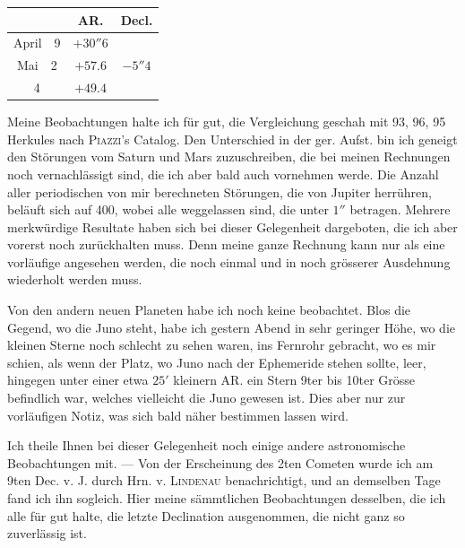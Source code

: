 \begin{center}
\fontsize{10}{12}\selectfont\setlength{\tabcolsep}{3pt}\renewcommand{\arraystretch}{1.15}\begin{tabular}{c|c|c}
 & AR. & Decl. \\
\hline
April\ \ 9 & $+30''6$ & \\
Mai\ \ 2 & $+57.6$ & $-5''4$ \\
4 & $+49.4$ & \\
\end{tabular}
\end{center}

\par\indent Meine Beobachtungen halte ich für gut, die Vergleichung geschah mit 93, 96, 95 Herkules nach \textsc{Piazzi}'s Catalog. Den Unterschied in der ger. Aufst. bin ich geneigt den Störungen vom Saturn und Mars zuzuschreiben, die bei meinen Rechnungen noch vernachlässigt sind, die ich aber bald auch vornehmen werde. Die Anzahl aller periodischen von mir berechneten Störungen, die von Jupiter herrühren, beläuft sich auf 400, wobei alle weggelassen sind, die unter $1''$ betragen. Mehrere merkwürdige Resultate haben sich bei dieser Gelegenheit dargeboten, die ich aber vorerst noch zurückhalten muss. Denn meine ganze Rechnung kann nur als eine vorläufige angesehen werden, die noch einmal und in noch grösserer Ausdehnung wiederholt werden muss.

\par\indent Von den andern neuen Planeten habe ich noch keine beobachtet. Blos die Gegend, wo die Juno steht, habe ich gestern Abend in sehr geringer Höhe, wo die kleinen Sterne noch schlecht zu sehen waren, ins Fernrohr gebracht, wo es mir schien, als wenn der Platz, wo Juno nach der Ephemeride stehen sollte, leer, hingegen unter einer etwa $25'$ kleinern AR. ein Stern 9ter bis 10ter Grösse befindlich war, welches vielleicht die Juno gewesen ist. Dies aber nur zur vorläufigen Notiz, was sich bald näher bestimmen lassen wird.

\par\indent Ich theile Ihnen bei dieser Gelegenheit noch einige andere astronomische Beobachtungen mit. — Von der Erscheinung des 2ten Cometen wurde ich am 9ten Dec. v. J. durch Hrn. v. \textsc{Lindenau} benachrichtigt, und an demselben Tage fand ich ihn sogleich. Hier meine sämmtlichen Beobachtungen desselben, die ich alle für gut halte, die letzte Declination ausgenommen, die nicht ganz so zuverlässig ist.

